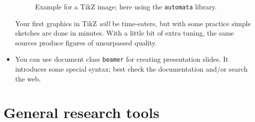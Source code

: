\documentclass[]{tukseminar}
\begin{document}
\begin{itemize}
\begin{figure}
\begin{center}
	    \end{center}
	    \caption{Example for a TikZ image; here using the \texttt{automata} library.}
	    \label{fig:tikz}
    \end{figure}
	Your first graphics in TikZ \emph{will} be time-eaters, but with some practice simple sketches are done in minutes.
	With a little bit of extra tuning, the same sources produce figures of unsurpassed quality.

  \item You can use document class \texttt{beamer} for creating presentation slides.
    It introduces some special syntax; best check the documentation and/or search the web.
\end{itemize}


\section{General research tools}
\end{document}
